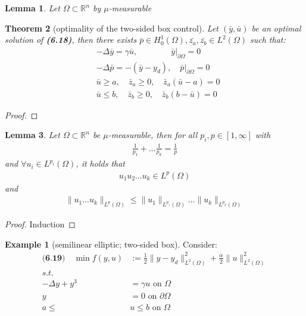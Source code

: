 \documentclass[a4paper,11pt,fleqn]{book}
\newtheorem{theorem}{Theorem}[section]
\newtheorem{lemma}[theorem]{Lemma}
\theoremstyle{definition}
\newtheorem*{example}{Example}
\theoremstyle{remark}
\begin{document}
\begin{lemma}
	Let $\Omega \subset \mathbb{R}^n$ by $\mu$-measurable
\end{lemma}

\begin{theorem}[optimality of the two-sided box control]
	Let $(\bar{y}, \bar{u})$ be an optimal solution of \textbf{(6.18)}, then there exists $\bar{p} \in H_0^1(\Omega), \bar{z_a}, \bar{z_b} \in L^2(\Omega)$ such that:
	\begin{align*}
		&-\Delta \bar{y} = \gamma \bar{u},\qquad \qquad \bar{y}|_{\partial\Omega}= 0\\
		&-\Delta \bar{p} = -(\bar{y} - y_d), \quad \bar{p}|_{\partial\Omega} = 0\\
		&\bar{u} \ge a,\quad  \bar{z}_a \ge 0,\quad \bar{z}_a(\bar{u} - a) = 0\\
		&\bar{u} \le b, \quad \bar{z}_b \ge 0, \quad \bar{z}_b(b - \bar{u}) = 0
	\end{align*}
\end{theorem}
\begin{proof}
	
\end{proof}

\begin{lemma}
	Let $\Omega \subset \mathbb{R}^n$ be $\mu$-measurable, then for all $p_i, p \in [1, \infty]$ with 
	\begin{align*}
		\frac{1}{p_1} + \dots \frac{1}{p_k} = \frac{1}{p}
	\end{align*}
	and $\forall u_i \in L^{p_i}(\Omega)$, it holds that 
	\begin{align*}
		u_1 u_2 \dots u_k \in L^p(\Omega)
	\end{align*}
	and 
	\begin{align*}
		\|u_1 \dots u_k \|_{L^p(\Omega)} \le \|u_1\|_{L^{p_1}(\Omega)}\dots\|u_k\|_{L^{p_k}(\Omega)}
	\end{align*}
\end{lemma}
\begin{proof}
	Induction
\end{proof}

\begin{example}[semilinear elliptic; two-sided box]
Consider:
\begin{align*}
\textbf{(6.19)} \quad
	\min f(y, u) &:= \frac{1}{2}\|y - y_d\|_{L^2(\Omega)}^2 + \frac{\alpha}{2}\|u\|_{L^2(\Omega)}^2\\
	s.t.\\
	-\Delta y + y^3 &= \gamma u \text{ on } \Omega\\
	y &= 0 \text{ on } \partial \Omega\\
	a \le &u \le b \text{ on } \Omega
\end{align*}	
\end{example}
\end{document}
